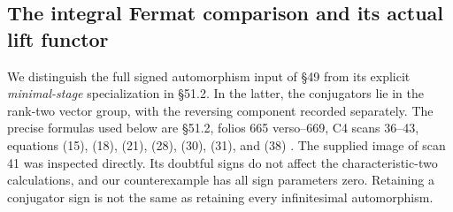 \subsection{The integral Fermat comparison and its actual lift functor}

We distinguish the full signed automorphism input of \S49 from its
explicit \emph{minimal-stage} specialization in \S51.2.  In the latter,
the conjugators lie in the rank-two vector group, with the reversing
component recorded separately.  The precise formulas used below are
\S51.2, folios 665 verso--669, C4 scans 36--43, equations (15),
(18), (21), (28), (30), (31), and (38)
\citep{Grothendieck1981FermatStage}.  The supplied image of scan 41
was inspected directly.  Its doubtful signs do not affect the
characteristic-two calculations, and our counterexample has all sign
parameters zero.  Retaining a conjugator sign is not the same as
retaining every infinitesimal automorphism.


